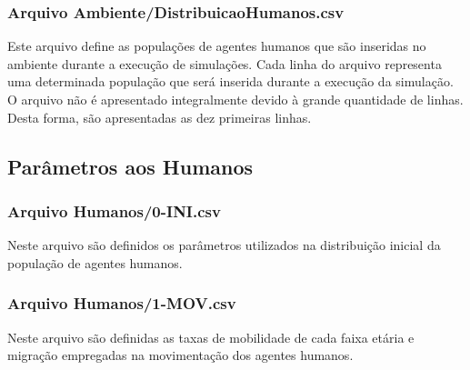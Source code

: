 

\newpage

\subsubsection{Arquivo Ambiente/DistribuicaoHumanos.csv}

Este arquivo define as populações de agentes humanos que são inseridas no ambiente durante a execução de simulações. Cada linha do arquivo representa uma determinada população que será inserida durante a execução da simulação. O arquivo não é apresentado integralmente devido à grande quantidade de linhas. Desta forma, são apresentadas as dez primeiras linhas.  



\newpage

\subsection{Parâmetros aos Humanos}

\subsubsection{Arquivo Humanos/0-INI.csv}

Neste arquivo são definidos os parâmetros utilizados na distribuição inicial da população de agentes humanos. 

\begin{center}
\end{center}

\newpage

\subsubsection{Arquivo Humanos/1-MOV.csv}

Neste arquivo são definidas as taxas de mobilidade de cada faixa etária e migração empregadas na movimentação dos agentes humanos. 

\begin{center}
\end{center}

